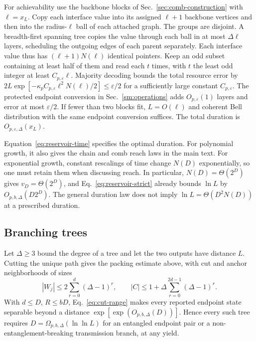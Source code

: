 \documentclass[aps,prl,twocolumn,superscriptaddress,longbibliography,reprint,floatfix]{revtex4-2}
\newcommand{\eps}{\varepsilon}
\begin{document}
For achievability use the backbone blocks of
Sec.~\ref{sec:comb-construction} with $\ell=x_L$.
Copy each interface value into its assigned $\ell+1$ backbone vertices
and then into the radius-$\ell$ ball of each attached graph.
The groups are disjoint. A breadth-first spanning tree copies the
value through each ball in at most $\Delta\ell$ layers, scheduling
the outgoing edges of each parent separately.
Each interface value thus has $(\ell+1)N(\ell)$ identical pointers.
Keep an odd subset containing at least half of them and read each
$t$ times, with $t$ the least odd integer at least $C_{p,\eps}\ell$. Majority decoding bounds the total
resource error by
$2L\exp[-\kappa_p C_{p,\eps}\ell^2N(\ell)/2]\le\eps/2$
for a sufficiently large constant $C_{p,\eps}$.
The protected endpoint conversion in Sec.~\ref{sm:operations}
adds $O_{p,\eps}(1)$ layers and error at most $\eps/2$.
If fewer than two blocks fit, $L=O(\ell)$ and coherent Bell distribution
with the same endpoint conversion suffices.
The total duration is $O_{p,\eps,\Delta}(x_L)$.

Equation~\eqref{eq:reservoir-time} specifies the optimal duration.
For polynomial growth, it also gives the chain and comb reach laws
in the main text. For exponential growth, constant rescalings of time
change $N(D)$ exponentially, so one must retain them when discussing
reach. In particular, $N(D)=\Theta(2^D)$ gives $v_D=\Theta(2^D)$,
and Eq.~\eqref{eq:reservoir-strict} already bounds
$\ln L$ by $O_{p,b,\Delta}(D2^D)$. The general duration law does not imply
$\ln L=\Theta(D^2N(D))$ at a prescribed duration.

\subsection{Branching trees}
\label{sec:branching-tree}

Let $\Delta\ge3$ bound the degree of a tree and let the two outputs
have distance $L$. Cutting the unique path gives the packing estimate
above, with cut and anchor neighborhoods of sizes
\[
 |W_j|\le2\sum_{r=0}^d(\Delta-1)^r,\qquad
 |C|\le1+\Delta\sum_{r=0}^{2d-1}(\Delta-1)^r .
\]
With $d\le D$, $R\le bD$,
Eq.~\eqref{eq:cut-range} makes every reported endpoint
state separable beyond a distance
$\exp[\exp(O_{p,b,\Delta}(D))]$.
Hence every such tree requires
$D=\Omega_{p,b,\Delta}(\ln\ln L)$ for an entangled endpoint pair
or a non-entanglement-breaking transmission branch, at any yield.
\end{document}
